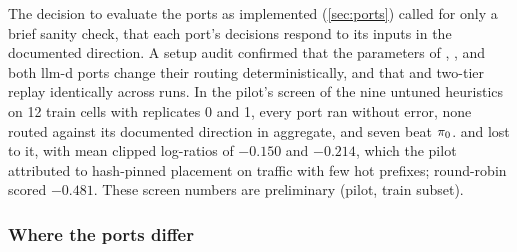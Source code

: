 The decision to evaluate the ports as implemented (\cref{sec:ports}) called for only a brief sanity
check, that each port's decisions respond to its inputs in the documented direction. A setup audit
confirmed that the parameters of , ,  and both llm-d
ports change their routing deterministically, and that  and two-tier replay
identically across runs. In the pilot's screen of the nine untuned heuristics on 12 train cells
with replicates 0 and 1, every port ran without error, none routed against its documented
direction in aggregate, and seven beat $\pi_{0}$.  and  lost to it,
with mean clipped log-ratios of $-0.150$ and $-0.214$, which the pilot attributed to hash-pinned
placement on traffic with few hot prefixes; round-robin scored $-0.481$. These screen numbers are
preliminary (pilot, train subset).

\subsubsection{Where the ports differ}

